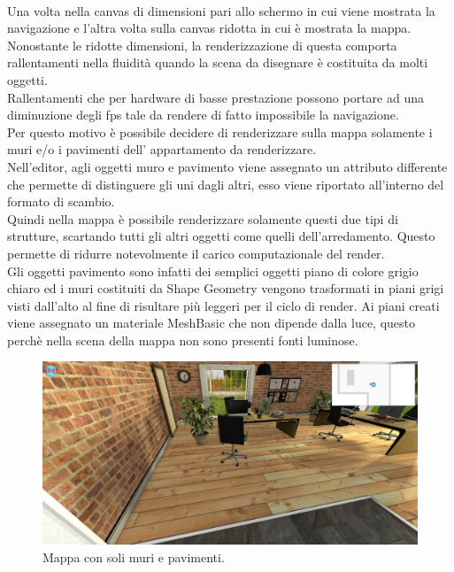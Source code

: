 \\
Una volta nella canvas di dimensioni pari allo schermo in cui viene mostrata la navigazione e l’altra volta sulla canvas ridotta in cui è mostrata la mappa. Nonostante le ridotte dimensioni, la renderizzazione di questa comporta rallentamenti nella fluidità quando la scena da disegnare è costituita da molti oggetti.
\\
Rallentamenti che per hardware di basse prestazione possono portare ad una diminuzione degli fps tale da rendere di fatto impossibile la navigazione.
\\
Per questo motivo è possibile decidere di renderizzare sulla mappa solamente i muri e/o i pavimenti dell’ appartamento da renderizzare.
\\
Nell’editor, agli oggetti muro e pavimento viene assegnato un attributo differente che permette di distinguere gli uni dagli altri, esso viene riportato all’interno del formato di scambio.
\\
Quindi nella mappa è possibile renderizzare solamente questi due tipi di strutture, scartando tutti gli altri oggetti come quelli dell’arredamento. Questo permette di ridurre notevolmente il carico computazionale del render. 
\\
Gli oggetti pavimento sono infatti dei semplici oggetti piano di colore grigio chiaro ed i muri costituiti da Shape Geometry vengono trasformati in piani grigi visti dall’alto al fine di risultare più leggeri per il ciclo di render. Ai piani creati viene assegnato un materiale MeshBasic che non dipende dalla luce, questo perchè nella scena della mappa non sono presenti fonti luminose.
\begin{figure}[htb]
 \centering
 \includegraphics[width=1\linewidth]{images/chapter_navigazione_scena/map_2d_json.png}\hfill
 \caption[Mappa con soli muri e pavimenti.]{Mappa con soli muri e pavimenti.}
 \label{fig:navigazione_scena_map_2d_json}
\end{figure}

